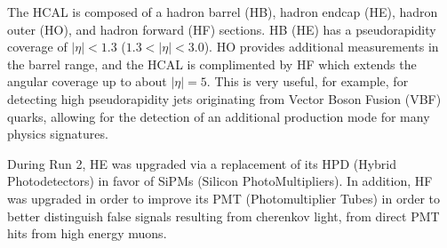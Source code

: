 The HCAL is composed of a hadron barrel (HB), hadron endcap (HE), hadron outer (HO), and hadron forward (HF) sections. HB (HE) has a pseudorapidity coverage of $|\eta| < 1.3$ ($1.3 < |\eta| < 3.0$). HO provides additional measurements in the barrel range, and the HCAL is complimented by HF which extends the angular coverage up to about $|\eta| = 5$. This is very useful, for example, for detecting high pseudorapidity jets originating from Vector Boson Fusion (VBF) quarks, allowing for the detection of an additional production mode for many physics signatures. 


During Run 2, HE was upgraded via a replacement of its HPD (Hybrid Photodetectors) in favor of SiPMs (Silicon PhotoMultipliers). In addition, HF was upgraded in order to improve its PMT (Photomultiplier Tubes) in order to better distinguish false signals resulting from cherenkov light, from direct PMT hits from high energy muons. 

